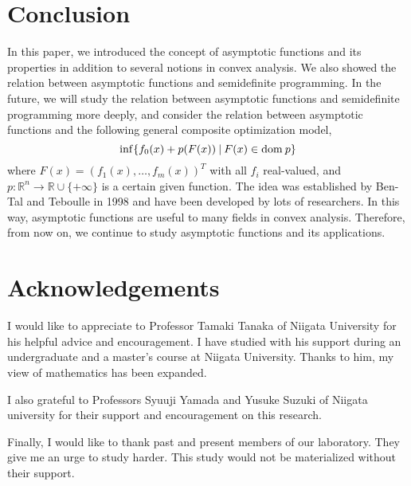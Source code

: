 \documentclass[a4paper,11pt, oneside]{book}
\theoremstyle{definition}
\newcommand{\RealNumberSet}{\mathbb{R}}
\newcommand{\NDemenstionalRealEuclideanSpace}{\mathbb{R}^n}
\newcommand{\Domain}[1]{\text{\rm dom\:${#1}$}} %
\newcommand{\ExtendedRealValuedFunction}[2]{{#1}: {#2} \to \RealNumberSet \cup \{+\infty\}}
\begin{document}
\chapter{Conclusion}
In this paper, we introduced the concept of asymptotic functions and its properties in addition to several notions in convex analysis. We also showed the relation between asymptotic functions and semidefinite programming. In the future, we will study the relation between asymptotic functions and semidefinite programming more deeply, and consider the relation between asymptotic functions and the following general composite optimization model,
\begin{equation}
  \inf \{f_0(x) + p(F(x)) \:|\: F(x) \in \Domain{p}\} \notag
\end{equation}
where $F(x) = (f_1(x), \dots, f_m(x))^T$ with all $f_i$ real-valued, and $\ExtendedRealValuedFunction{p} {\NDemenstionalRealEuclideanSpace}$ is a certain given function. The idea was established by Ben-Tal and Teboulle in 1998 and have been developed by lots of researchers. In this way, asymptotic functions are useful to many fields in convex analysis. Therefore, from now on, we continue to study asymptotic functions and its applications.

\chapter*{Acknowledgements}

I would like to appreciate to Professor Tamaki Tanaka of Niigata University for his helpful advice and encouragement. I have studied with his support during an undergraduate and a master's course at Niigata University. Thanks to him, my view of mathematics has been expanded.

I also grateful to Professors Syuuji Yamada and Yusuke Suzuki of Niigata university for their support and encouragement on this research.

Finally, I would like to thank past and present members of our laboratory. They give me an urge to study harder. This study would not be materialized without their support.
\end{document}
